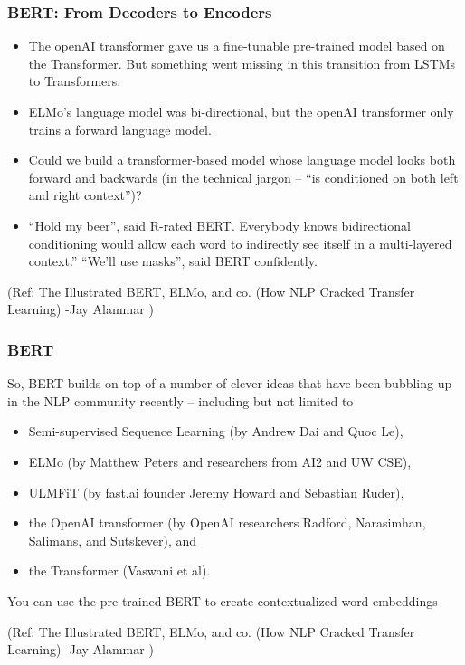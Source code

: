 \begin{frame}[fragile]\frametitle{BERT: From Decoders to Encoders}
\begin{itemize}
\item The openAI transformer gave us a fine-tunable pre-trained model based on the Transformer. But something went missing in this transition from LSTMs to Transformers. 
\item ELMo’s language model was bi-directional, but the openAI transformer only trains a forward language model. 
\item Could we build a transformer-based model whose language model looks both forward and backwards (in the technical jargon – “is conditioned on both left and right context”)?
\item 
“Hold my beer”, said R-rated BERT. Everybody knows bidirectional conditioning would allow each word to indirectly see itself in a multi-layered context.” “We’ll use masks”, said BERT confidently.
\end{itemize}


{\tiny (Ref: The Illustrated BERT, ELMo, and co. (How NLP Cracked Transfer Learning) -Jay Alammar )}
\end{frame}


\begin{frame}[fragile]\frametitle{BERT}
So, BERT builds on top of a number of clever ideas that have been bubbling up in the NLP community recently – 
including but not limited to 
\begin{itemize}
\item  Semi-supervised Sequence Learning (by Andrew Dai and Quoc Le), 
\item  ELMo (by Matthew Peters and researchers from AI2 and UW CSE), 
\item  ULMFiT (by fast.ai founder Jeremy Howard and Sebastian Ruder), 
\item  the OpenAI transformer (by OpenAI researchers Radford, Narasimhan, Salimans, and Sutskever), and 
\item  the Transformer (Vaswani et al).
\end{itemize}

You can use the pre-trained BERT to create contextualized word embeddings

{\tiny (Ref: The Illustrated BERT, ELMo, and co. (How NLP Cracked Transfer Learning) -Jay Alammar )}
\end{frame}



